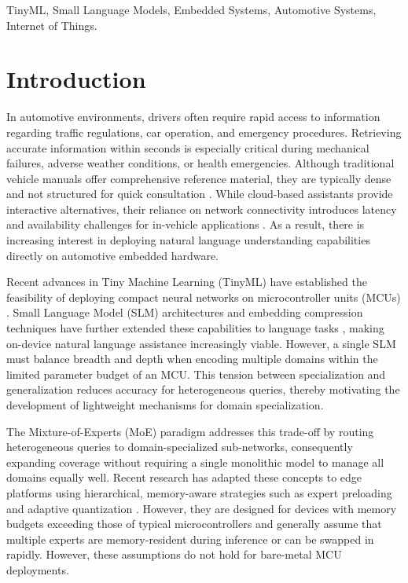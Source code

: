\documentclass[conference]{IEEEtran}
\begin{document}
\begin{IEEEkeywords}
 TinyML, Small Language Models, Embedded Systems, Automotive Systems, Internet of Things.
\end{IEEEkeywords}



\section{Introduction}
\label{sec:introduction}

In automotive environments, drivers often require rapid access to information regarding traffic regulations, car operation, and emergency procedures. Retrieving accurate information within seconds is especially critical during mechanical failures, adverse weather conditions, or health emergencies. Although traditional vehicle manuals offer comprehensive reference material, they are typically dense and not structured for quick consultation \cite{electronics13244972,lee2023llmchatbot}. While cloud-based assistants provide interactive alternatives, their reliance on network connectivity introduces latency and availability challenges for in-vehicle applications \cite{surveyGenAI}. As a result, there is increasing interest in deploying natural language understanding capabilities directly on automotive embedded hardware. 

Recent advances in Tiny Machine Learning (TinyML) have established the feasibility of deploying compact neural networks on microcontroller units (MCUs) \cite{tinymlops}. Small Language Model (SLM) architectures and embedding compression techniques have further extended these capabilities to language tasks \cite{yang2023tinyformer, 10.1145/3676536.3676747}, making on-device natural language assistance increasingly viable. However, a single SLM must balance breadth and depth when encoding multiple domains within the limited parameter budget of an MCU. This tension between specialization and generalization reduces accuracy for heterogeneous queries, thereby motivating the development of lightweight mechanisms for domain specialization.


The Mixture-of-Experts (MoE) paradigm addresses this trade-off by routing heterogeneous queries to domain-specialized sub-networks, consequently expanding coverage without requiring a single monolithic model to manage all domains equally well. Recent research has adapted these concepts to edge platforms using hierarchical, memory-aware strategies such as expert preloading and adaptive quantization \cite{yi2025edgemoe}. However, they are designed for devices with memory budgets exceeding those of typical microcontrollers and generally assume that multiple experts are memory-resident during inference or can be swapped in rapidly. However, these assumptions do not hold for bare-metal MCU deployments.
\end{document}

